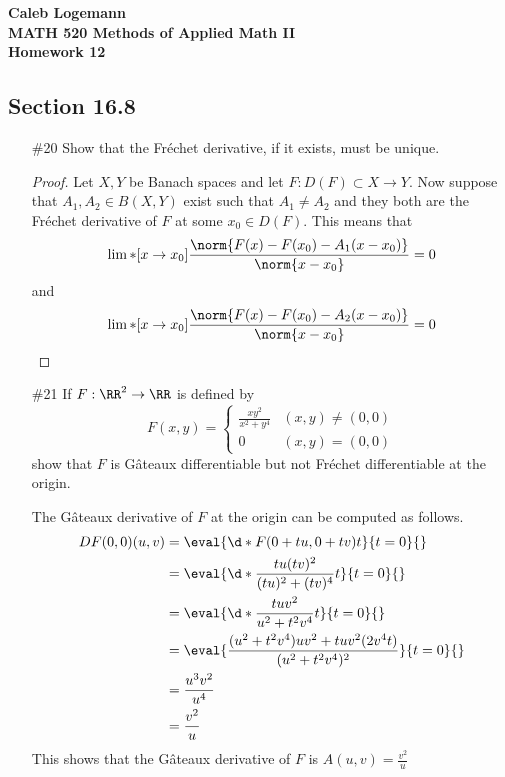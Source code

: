 \documentclass[11pt, oneside]{article}
\begin{document}
\noindent \textbf{\Large{Caleb Logemann \\
MATH 520 Methods of Applied Math II \\
Homework 12
}}

\subsection*{Section 16.8}
\begin{enumerate}
  \item[\#20]
    Show that the Fr\'echet derivative, if it exists, must be unique.

    \begin{proof}
      Let $X, Y$ be Banach spaces and let $F: D(F) \subset X \to Y$.
      Now suppose that $A_1, A_2 \in B(X, Y)$ exist such that $A_1 \neq A_2$ and
      they both are the Fr\'echet derivative of $F$ at some $x_0 \in D(F)$.
      This means that
      \[
        \lim*[x \to x_0]{\frac{\norm{F(x) - F(x_0) - A_1(x - x_0)}}{\norm{x - x_0}}} = 0
      \]
      and
      \[
        \lim*[x \to x_0]{\frac{\norm{F(x) - F(x_0) - A_2(x - x_0)}}{\norm{x - x_0}}} = 0
      \]
    \end{proof}

  \pagebreak
  \item[\#21]
    If $F: \RR^2 \to \RR$ is defined by
    \[
      F(x, y) =
      \begin{cases}
        \frac{xy^2}{x^2 + y^4} & (x, y) \neq (0, 0) \\
        0 & (x, y) = (0, 0)
      \end{cases}
    \]
    show that $F$ is G\^ateaux differentiable but not Fr\'echet differentiable
    at the origin.

    The G\^ateaux derivative of $F$ at the origin can be computed as follows.
    \begin{align*}
      DF(0, 0)(u, v) &= \eval{\d*{F(0 + tu, 0 + tv)}{t}}{t=0}{} \\
      &= \eval{\d*{\frac{tu (tv)^2}{(tu)^2 + (tv)^4}}{t}}{t = 0}{} \\
      &= \eval{\d*{\frac{t uv^2}{u^2 + t^2v^4}}{t}}{t = 0}{} \\
      &= \eval{\frac{(u^2 + t^2v^4)uv^2 + tuv^2(2v^4 t)}{(u^2 + t^2 v^4)^2}}{t = 0}{} \\
      &= \frac{u^3v^2}{u^4} \\
      &= \frac{v^2}{u}
    \end{align*}
    This shows that the G\^ateaux derivative of $F$ is $A(u, v) = \frac{v^2}{u}$


\end{enumerate}
\end{document}
